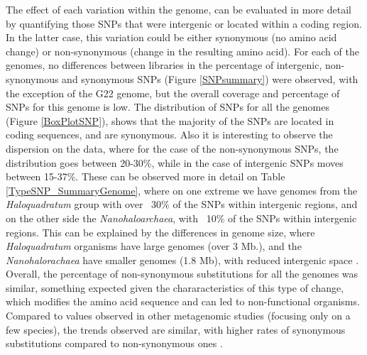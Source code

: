 The effect of each variation within the genome, can be evaluated in more detail by quantifying those SNPs that were intergenic or located within a coding region. In the latter case, this variation could be either synonymous (no amino acid change) or non-synonymous (change in the resulting amino acid). For each of the genomes, no differences between libraries in the percentage of intergenic, non-synonymous and synonymous SNPs (Figure \ref{SNPsummary}) were observed, with the exception of the G22 genome, but the overall coverage and percentage of SNPs for this genome is low. The distribution of SNPs for all the genomes (Figure \ref{BoxPlotSNP}), shows that the majority of the SNPs are located in coding sequences, and are synonymous. Also it is interesting to observe the dispersion on the data, where for the case of the non-synonymous SNPs, the distribution goes between 20-30\%, while in the case of intergenic SNPs moves between 15-37\%. These can be observed more in detail on Table \ref{TypeSNP_SummaryGenome}, where on one extreme we have genomes from the \textit{Haloquadratum} group with over ~30\% of the SNPs within intergenic regions, and on the other side the \textit{Nanohaloarchaea}, with ~10\% of the SNPs within intergenic regions. This can be explained by the differences in genome size, where \textit{Haloquadratum} organisms have large genomes (over 3 Mb.), and the \textit{Nanohalorachaea} have smaller genomes (1.8 Mb), with reduced intergenic space \cite{Narasingarao:2012kp,Podell:2013kx}. Overall, the percentage of non-synonymous substitutions for all the genomes was similar, something expected given the chararacteristics of this type of change, which modifies the amino acid sequence and can led to non-functional organisms. Compared to values observed in other metagenomic studies (focusing only on a few species), the trends observed are similar, with higher rates of synonymous substitutions compared to non-synonymous ones \cite{Simmons:2008by}.


